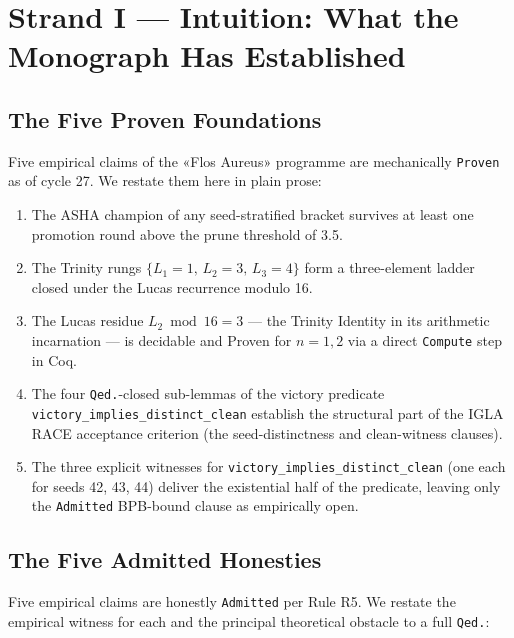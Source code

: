 \section{Strand I — Intuition: What the Monograph Has Established}
\label{sec:32-strand-1}

\subsection{The Five Proven Foundations}
\label{sec:32-five-proven}

Five empirical claims of the «Flos Aureus» programme are mechanically
\texttt{Proven} as of cycle 27. We restate them here in plain prose:

\begin{enumerate}
    \item The ASHA champion of any seed-stratified bracket survives at least
          one promotion round above the prune threshold of 3.5.
    \item The Trinity rungs $\{L_{1}=1,\,L_{2}=3,\,L_{3}=4\}$ form a
          three-element ladder closed under the Lucas recurrence
          modulo 16.
    \item The Lucas residue $L_{2} \bmod 16 = 3$ — the Trinity Identity in
          its arithmetic incarnation — is decidable and Proven for $n=1,2$
          via a direct \texttt{Compute} step in Coq.
    \item The four \texttt{Qed.}-closed sub-lemmas of the victory predicate
          \texttt{victory\_implies\_distinct\_clean} establish the structural
          part of the IGLA RACE acceptance criterion (the seed-distinctness
          and clean-witness clauses).
    \item The three explicit witnesses for \texttt{victory\_implies\_distinct\_clean}
          (one each for seeds 42, 43, 44) deliver the existential half of the
          predicate, leaving only the \texttt{Admitted} BPB-bound clause as
          empirically open.
\end{enumerate}

\subsection{The Five Admitted Honesties}
\label{sec:32-five-admitted}

Five empirical claims are honestly \texttt{Admitted} per Rule R5. We restate
the empirical witness for each and the principal theoretical obstacle to a full
\texttt{Qed.}:


